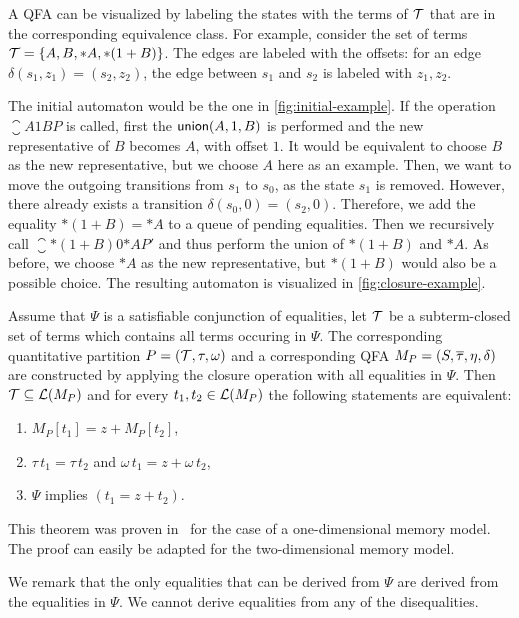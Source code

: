 \begin{example}
  A QFA can be visualized by labeling the states with the terms of $\mathcal{T}$ that are in the corresponding equivalence class.
  For example, consider the set of terms $\mathcal{T} = \{A, B, *A, *(1 + B)\}$.
  The edges are labeled with the offsets: for an edge $\delta(s_1, z_1) = (s_2, z_2)$, the edge between $s_1$ and $s_2$ is labeled with $z_1, z_2$.

  The initial automaton would be the one in \cref{fig:initial-example}.
  If the operation $\closure{A}{1}{B}{P}$ is called,
  first the $\textsf{union}(A, 1, B)$ is performed and the new representative of $B$ becomes $A$, with offset $1$.
  It would be equivalent to choose $B$ as the new representative, but we choose $A$ here as an example.
  Then, we want to move the outgoing transitions from $s_1$ to $s_0$, as the state $s_1$ is removed.
  However, there already exists a transition $\delta(s_0,0) = (s_2, 0)$.
  Therefore, we add the equality $*(1 + B) = *A$ to a queue of pending equalities.
  Then we recursively call $\closure{*(1 + B)}{0}{*A}{P'}$ and thus perform the union of $*(1 + B)$ and $*A$.
  As before, we choose $*A$ as the new representative, but $*(1+B)$ would also be a possible choice.
  The resulting automaton is visualized in \cref{fig:closure-example}.
\end{example}

\begin{theorem}
  Assume that $\Psi$ is a satisfiable conjunction of equalities, let $\mathcal{T}$ be a subterm-closed set of terms which contains all terms occuring in $\Psi$.
  The corresponding quantitative partition $P = (\mathcal{T}, \tau,\omega)$ and a corresponding QFA $M_P = (S, \overline{\tau}, \eta, \delta)$ are constructed by applying the closure operation with all equalities in $\Psi$.
  Then $\mathcal{T} \subseteq \mathcal{L}(M_P)$ and for every $t_1, t_2 \in \mathcal{L}(M_P)$ the following statements are equivalent:
  \begin{enumerate}
    \item $M_P[t_1] = z + M_P[t_2]$,
    \item $\tau\,t_1 = \tau\,t_2$ and $\omega\,t_1 = z + \omega\,t_2$,
    \item $\Psi$ implies $(t_1 = z + t_2)$.
  \end{enumerate}
\end{theorem}

This theorem was proven in~\cite{2pointer} for the case of a one-dimensional memory model.
The proof can easily be adapted for the two-dimensional memory model.

We remark that the only equalities that can be derived from $\Psi$ are derived from the equalities in $\Psi$. We cannot derive equalities from any of the disequalities.
